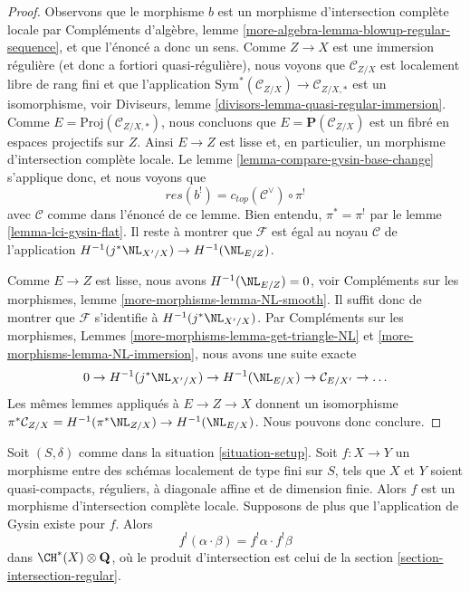 \begin{proof}
Observons que le morphisme $b$ est un morphisme d'intersection complète locale
par Compléments d'algèbre, lemme \ref{more-algebra-lemma-blowup-regular-sequence},
et que l'énoncé a donc un sens. Comme $Z \to X$ est une
immersion régulière (et donc a fortiori quasi-régulière), nous voyons que $\mathcal{C}_{Z/X}$
est localement libre de rang fini et que l'application
$\text{Sym}^*(\mathcal{C}_{Z/X}) \to \mathcal{C}_{Z/X, *}$
est un isomorphisme, voir
Diviseurs, lemme \ref{divisors-lemma-quasi-regular-immersion}.
Comme $E = \text{Proj}(\mathcal{C}_{Z/X, *})$, nous concluons
que $E = \mathbf{P}(\mathcal{C}_{Z/X})$
est un fibré en espaces projectifs sur $Z$.
Ainsi $E \to Z$ est lisse et, en particulier, un morphisme d'intersection complète
locale. Le lemme \ref{lemma-compare-gysin-base-change}
s'applique donc, et nous voyons que
$$
res(b^!) = c_{top}(\mathcal{C}^\vee) \circ \pi^!
$$
avec $\mathcal{C}$ comme dans l'énoncé de ce lemme.
Bien entendu, $\pi^* = \pi^!$ par le lemme \ref{lemma-lci-gysin-flat}.
Il reste à montrer que $\mathcal{F}$ est égal au
noyau $\mathcal{C}$ de l'application
$H^{-1}(j^*\NL_{X'/X}) \to H^{-1}(\NL_{E/Z})$.

\medskip\noindent
Comme $E \to Z$ est lisse, nous avons $H^{-1}(\NL_{E/Z}) = 0$, voir
Compléments sur les morphismes, lemme \ref{more-morphisms-lemma-NL-smooth}.
Il suffit donc de montrer que $\mathcal{F}$ s'identifie
à $H^{-1}(j^*\NL_{X'/X})$. Par Compléments sur les morphismes, Lemmes
\ref{more-morphisms-lemma-get-triangle-NL} et
\ref{more-morphisms-lemma-NL-immersion}, nous avons une suite exacte
$$
0 \to H^{-1}(j^*\NL_{X'/X}) \to H^{-1}(\NL_{E/X}) \to
\mathcal{C}_{E/X'} \to \ldots
$$
Les mêmes lemmes appliqués à $E \to Z \to X$ donnent un isomorphisme
$\pi^*\mathcal{C}_{Z/X} = H^{-1}(\pi^*\NL_{Z/X}) \to H^{-1}(\NL_{E/X})$.
Nous pouvons donc conclure.
\end{proof}

\begin{lemma}
\label{lemma-lci-gysin-product-regular}
Soit $(S, \delta)$ comme dans la situation \ref{situation-setup}.
Soit $f : X \to Y$ un morphisme entre des schémas localement de type
fini sur $S$, tels que $X$ et $Y$ soient quasi-compacts,
réguliers, à diagonale affine et de dimension finie.
Alors $f$ est un morphisme d'intersection complète locale.
Supposons de plus que l'application de Gysin existe pour $f$. Alors
$$
f^!(\alpha \cdot \beta) = f^!\alpha \cdot f^!\beta
$$
dans $\CH^*(X) \otimes \mathbf{Q}$, où le produit d'intersection
est celui de la section \ref{section-intersection-regular}.
\end{lemma}

